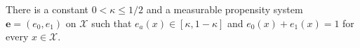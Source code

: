 There is a constant \(0<\kappa\le1/2\) and a measurable propensity system \(\boldsymbol e=(e_0,e_1)\) on \(\mathcal X\) such that \(e_a(x)\in[\kappa,1-\kappa]\) and \(e_0(x)+e_1(x)=1\) for every \(x\in\mathcal X\).